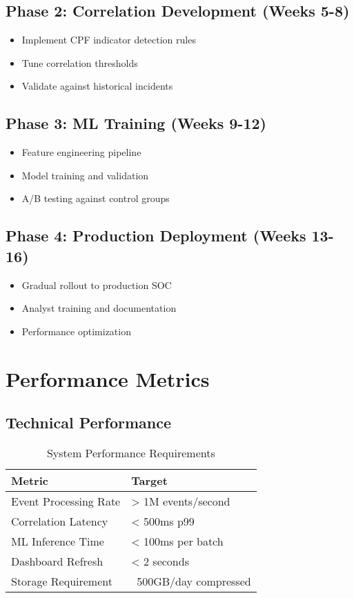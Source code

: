 \documentclass[11pt,a4paper]{article}
\begin{document}
\subsection{Phase 2: Correlation Development (Weeks 5-8)}
\begin{itemize}
\item Implement CPF indicator detection rules
\item Tune correlation thresholds
\item Validate against historical incidents
\end{itemize}

\subsection{Phase 3: ML Training (Weeks 9-12)}
\begin{itemize}
\item Feature engineering pipeline
\item Model training and validation
\item A/B testing against control groups
\end{itemize}

\subsection{Phase 4: Production Deployment (Weeks 13-16)}
\begin{itemize}
\item Gradual rollout to production SOC
\item Analyst training and documentation
\item Performance optimization
\end{itemize}

\section{Performance Metrics}

\subsection{Technical Performance}

\begin{table}[H]
\centering
\caption{System Performance Requirements}
\begin{tabular}{ll}
\toprule
Metric & Target \\
\midrule
Event Processing Rate & > 1M events/second \\
Correlation Latency & < 500ms p99 \\
ML Inference Time & < 100ms per batch \\
Dashboard Refresh & < 2 seconds \\
Storage Requirement & ~500GB/day compressed \\
\bottomrule
\end{tabular}
\end{table}
\end{document}
